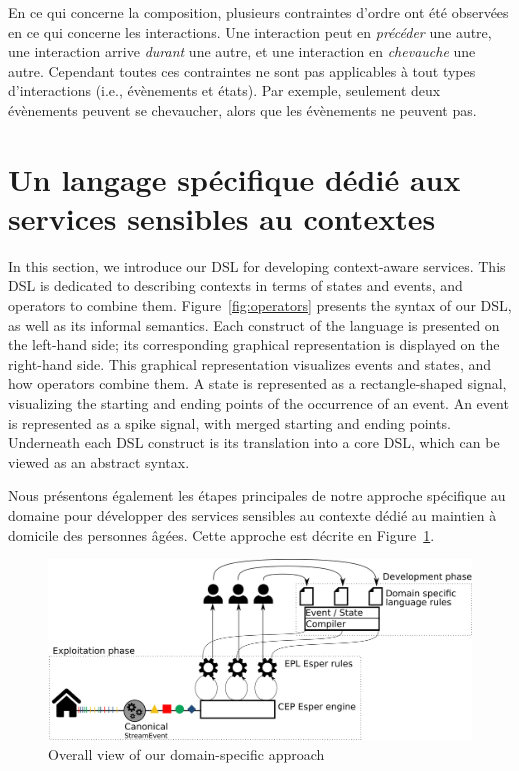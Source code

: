 En ce qui concerne la composition, plusieurs contraintes d'ordre ont été observées en ce qui concerne les interactions. Une interaction peut en {\em précéder} une autre, une interaction arrive {\em durant} une autre, et une interaction en {\em chevauche} une autre. Cependant toutes ces contraintes ne sont pas applicables à tout types d'interactions ({i.e.,} évènements et états). Par exemple, seulement deux évènements peuvent se chevaucher, alors que les évènements ne peuvent pas. 

\section{Un langage spécifique dédié aux services sensibles au contextes}\label{sec:dsl}

In this section, we introduce our DSL for developing context-aware services. This DSL is dedicated to describing contexts in terms of states and events, and operators to combine them. Figure~\ref{fig:operators}  presents the syntax of our DSL, as well as its informal semantics. Each construct of the language is presented on the left-hand side; its corresponding graphical representation is displayed on the right-hand side. This graphical representation visualizes events and states, and how operators combine them. A state is represented as a rectangle-shaped signal, visualizing the starting and ending points of the occurrence of an event. An event is represented as a spike signal, with merged starting and ending points. Underneath each DSL construct is its translation into a core DSL, which can be viewed as an abstract syntax.

Nous présentons également les étapes principales de notre approche spécifique au domaine pour développer des services sensibles au contexte dédié au maintien à domicile des personnes âgées. Cette approche est décrite en Figure~\ref{fig:functionalarchi}.

\begin{figure}[h]
\centering
  \includegraphics[scale=0.2]{gfx/approach}
\caption{Overall view of our domain-specific approach}
\label{fig:functionalarchi}
\end{figure}

